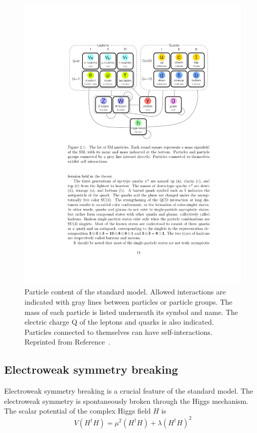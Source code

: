 \begin{figure}[htbp]
    \centering
    \includegraphics[width=\textwidth]{Figures/Theory/SM_Interactions.pdf}
    \caption[Particle content of the standard model.]{Particle content of the standard model. Allowed interactions are indicated with gray lines between particles or particle groups. The mass of each particle is listed underneath its symbol and name. The electric charge Q of the leptons and quarks is also indicated. Particles connected to themselves can have self-interactions.
    Reprinted from Reference~\cite{Yutaro}.}
    \label{fig:SMint}
\end{figure}


\subsection{Electroweak symmetry breaking}
\label{sec:EWSB}
Electroweak symmetry breaking is a crucial feature of the standard model. The electroweak symmetry is spontaneously broken through the Higgs mechanism. 
The scalar potential of the complex Higgs field $H$ is
\begin{equation}
V(H^\dagger H) =  \mu^2(H^\dagger H) + \lambda(H^\dagger H)^2
\label{equ:HiggsV}
\end{equation}

